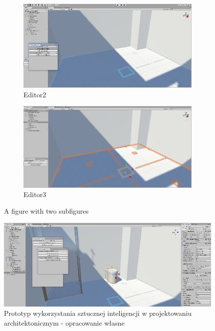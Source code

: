 \documentclass[runningheads]{llncs}
\begin{document}
\begin{figure}
\centering
\begin{subfigure}[b]{.5\textwidth}
  \includegraphics[width=.93\linewidth]{editor2.png}
    \caption{Editor2}
      \label{fig4}
\end{subfigure}%
\begin{subfigure}[b]{.5\textwidth}
  \includegraphics[width=.96\linewidth]{editor3.png}
  \caption{Editor3}
  \label{fig5}
\end{subfigure}
\caption{A figure with two subfigures}
\end{figure}

\begin{figure}
\centering
\includegraphics[width=\textwidth]{editor4.png}
\caption{Prototyp wykorzystania sztucznej inteligencji w projektowaniu architektonicznym - 
opracowanie własne} \label{fig3}
\end{figure}
\end{document}
